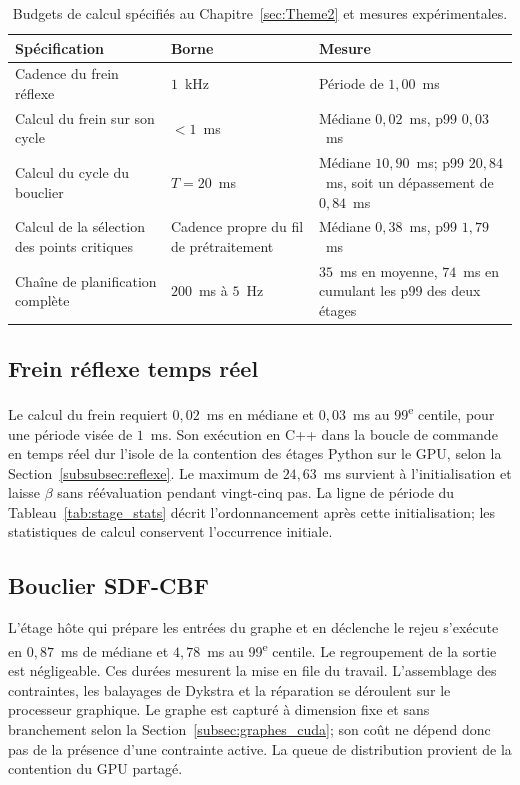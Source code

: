 \begin{table}[htbp]
\centering
\caption{Budgets de calcul spécifiés au Chapitre~\ref{sec:Theme2} et mesures expérimentales.}
\label{tab:res_budget}
\small
\begin{tabular}{>{\raggedright\arraybackslash}p{4.6cm}>{\raggedright\arraybackslash}p{3.0cm}>{\raggedright\arraybackslash}p{5.4cm}}
\toprule
Spécification & Borne & Mesure \\
\midrule
Cadence du frein réflexe & $1$~kHz & Période de $1{,}00$~ms \\ \addlinespace[0.2em]
Calcul du frein sur son cycle & $< 1$~ms & Médiane $0{,}02$~ms, p99 $0{,}03$~ms \\ \addlinespace[0.2em]
Calcul du cycle du bouclier & $T = 20$~ms & Médiane $10{,}90$~ms; p99 $20{,}84$~ms, soit un dépassement de $0{,}84$~ms \\ \addlinespace[0.2em]
Calcul de la sélection des points critiques & Cadence propre du fil de prétraitement & Médiane $0{,}38$~ms, p99 $1{,}79$~ms \\ \addlinespace[0.2em]
Chaîne de planification complète & $200$~ms à $5$~Hz & $35$~ms en moyenne, $74$~ms en cumulant les p99 des deux étages \\
\bottomrule
\end{tabular}
\end{table}

\subsection*{Frein réflexe temps réel}
Le calcul du frein requiert $0{,}02$~ms en médiane et $0{,}03$~ms au 99\textsuperscript{e} centile, pour une période visée de $1$~ms. Son exécution en C++ dans la boucle de commande en temps réel dur l'isole de la contention des étages Python sur le \ac{GPU}, selon la Section~\ref{subsubsec:reflexe}. Le maximum de $24{,}63$~ms survient à l'initialisation et laisse $\beta$ sans réévaluation pendant vingt-cinq pas. La ligne de période du Tableau~\ref{tab:stage_stats} décrit l'ordonnancement après cette initialisation; les statistiques de calcul conservent l'occurrence initiale.

\subsection*{Bouclier \acs{SDF}-\acs{CBF}}
L'étage hôte qui prépare les entrées du graphe et en déclenche le rejeu s'exécute en $0{,}87$~ms de médiane et $4{,}78$~ms au 99\textsuperscript{e} centile. Le regroupement de la sortie est négligeable. Ces durées mesurent la mise en file du travail. L'assemblage des contraintes, les balayages de Dykstra et la réparation se déroulent sur le processeur graphique. Le graphe est capturé à dimension fixe et sans branchement selon la Section~\ref{subsec:graphes_cuda}; son coût ne dépend donc pas de la présence d'une contrainte active. La queue de distribution provient de la contention du \ac{GPU} partagé.

